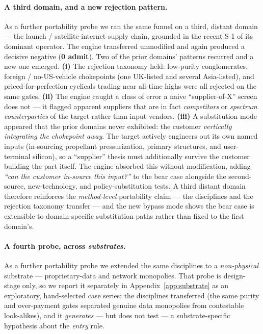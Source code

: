 \documentclass[11pt]{article}
\begin{document}
\paragraph{A third domain, and a new rejection pattern.} As a further portability
probe we ran the same funnel on a third, distant domain --- the launch /
satellite-internet supply chain, grounded in the recent S-1 of its dominant
operator. The engine transferred unmodified and again produced a decisive negative
(\textbf{0 admit}). Two of the prior domains' patterns recurred and a new one
emerged. \textbf{(i)} The rejection taxonomy held: low-purity conglomerates,
foreign / no-US-vehicle chokepoints (one UK-listed and several Asia-listed), and
priced-for-perfection cyclicals trading near all-time highs were all rejected on
the same gates. \textbf{(ii)} The engine caught a class of error a naive
``supplier-of-X'' screen does not --- it flagged apparent suppliers that are in
fact \emph{competitors} or \emph{spectrum counterparties} of the target rather than
input vendors. \textbf{(iii)} A substitution mode appeared that the prior domains
never exhibited: the customer \emph{vertically integrating the chokepoint away}.
The target actively engineers out its own named inputs (in-sourcing propellant
pressurization, primary structures, and user-terminal silicon), so a ``supplier''
thesis must additionally survive the customer building the part itself. The engine
absorbed this without modification, adding \emph{``can the customer in-source this
input?''} to the bear case alongside the second-source, new-technology, and
policy-substitution tests. A third distant domain therefore reinforces the
\emph{method-level} portability claim --- the disciplines and the rejection
taxonomy transfer --- and the new bypass mode shows the bear case is extensible to
domain-specific substitution paths rather than fixed to the first domain's.

\paragraph{A fourth probe, across \emph{substrates}.} As a further portability probe we extended the
same disciplines to a \emph{non-physical} substrate --- proprietary-data and network monopolies.
That probe is design-stage only, so we report it separately in
Appendix~\ref{app:substrate} as an exploratory, hand-selected case series: the disciplines
transferred (the same purity and over-payment gates
separated genuine data monopolies from contestable look-alikes), and it \emph{generates} --- but does
not test --- a substrate-specific hypothesis about the \emph{entry} rule.
\end{document}
